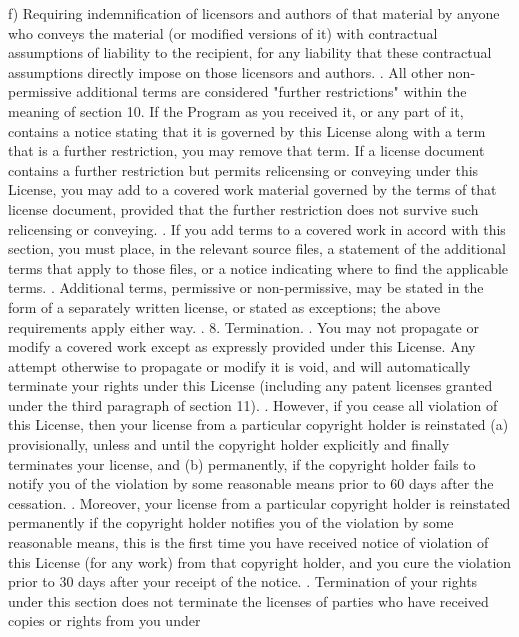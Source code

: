 \begin{script}
     f) Requiring indemnification of licensors and authors of that
     material by anyone who conveys the material (or modified versions of
     it) with contractual assumptions of liability to the recipient, for
     any liability that these contractual assumptions directly impose on
     those licensors and authors.
 .
   All other non-permissive additional terms are considered "further
 restrictions" within the meaning of section 10.  If the Program as you
 received it, or any part of it, contains a notice stating that it is
 governed by this License along with a term that is a further
 restriction, you may remove that term.  If a license document contains
 a further restriction but permits relicensing or conveying under this
 License, you may add to a covered work material governed by the terms
 of that license document, provided that the further restriction does
 not survive such relicensing or conveying.
 .
   If you add terms to a covered work in accord with this section, you
 must place, in the relevant source files, a statement of the
 additional terms that apply to those files, or a notice indicating
 where to find the applicable terms.
 .
   Additional terms, permissive or non-permissive, may be stated in the
 form of a separately written license, or stated as exceptions;
 the above requirements apply either way.
 .
   8. Termination.
 .
   You may not propagate or modify a covered work except as expressly
 provided under this License.  Any attempt otherwise to propagate or
 modify it is void, and will automatically terminate your rights under
 this License (including any patent licenses granted under the third
 paragraph of section 11).
 .
   However, if you cease all violation of this License, then your
 license from a particular copyright holder is reinstated (a)
 provisionally, unless and until the copyright holder explicitly and
 finally terminates your license, and (b) permanently, if the copyright
 holder fails to notify you of the violation by some reasonable means
 prior to 60 days after the cessation.
 .
   Moreover, your license from a particular copyright holder is
 reinstated permanently if the copyright holder notifies you of the
 violation by some reasonable means, this is the first time you have
 received notice of violation of this License (for any work) from that
 copyright holder, and you cure the violation prior to 30 days after
 your receipt of the notice.
 .
   Termination of your rights under this section does not terminate the
 licenses of parties who have received copies or rights from you under

\end{script}
